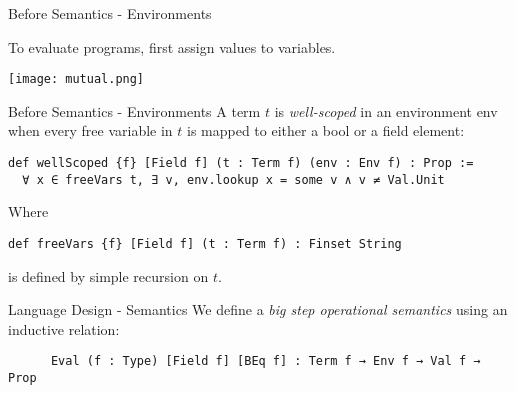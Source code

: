 \documentclass[aspectratio=169]{beamer}
\begin{document}
\begin{frame}[fragile]{Before Semantics - Environments}
\begin{center}
To evaluate programs, first assign values to variables.

\vspace{1em}
\texttt{[image: mutual.png]}
\end{center}
\end{frame}

\begin{frame}[fragile]{Before Semantics - Environments}
A term $t$ is \textit{well-scoped} in an environment env when every free variable in $t$ is mapped to either a bool or a field element:
\begin{lstlisting}
def wellScoped {f} [Field f] (t : Term f) (env : Env f) : Prop :=
  ∀ x ∈ freeVars t, ∃ v, env.lookup x = some v ∧ v ≠ Val.Unit
\end{lstlisting}
Where
\begin{lstlisting}
def freeVars {f} [Field f] (t : Term f) : Finset String
\end{lstlisting}
is defined by simple recursion on $t$.
\end{frame}

\begin{frame}[fragile]{Language Design - Semantics}
\centering
We define a \textit{big step operational semantics} using an inductive relation:

\vspace{1em}

\begin{block}{}
\begin{lstlisting}
      Eval (f : Type) [Field f] [BEq f] : Term f → Env f → Val f → Prop
\end{lstlisting}
\end{block}
\end{frame}
\end{document}
